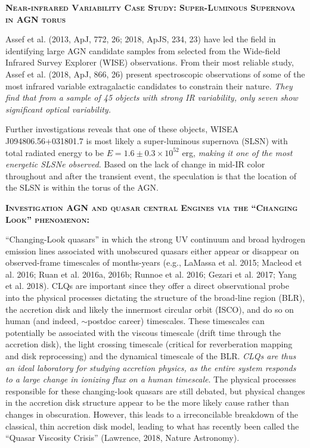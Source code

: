\documentclass[12pt]{article}
\begin{document}
\smallskip
\smallskip
\noindent
\textbf{\textsc{Near-infrared Variability Case Study: Super-Luminous Supernova in AGN torus}} 

\smallskip
\smallskip
\noindent
Assef et al. (2013, ApJ, 772, 26; 2018, ApJS, 234, 23) have led the field in identifying large AGN candidate samples from selected from the Wide-field Infrared Survey Explorer (WISE) observations. 
From their most reliable study, Assef et al. (2018, ApJ, 866, 26) present spectroscopic observations of some of the most infrared variable extragalactic candidates to constrain their nature. {\it They find that from a sample of 45 objects with strong IR variability, only seven show significant optical variability.}  

\smallskip
\smallskip
\noindent
Further investigations reveals that one of these objects, WISEA J094806.56+031801.7  is most likely a super-luminous supernova (SLSN) with total radiated energy to be $E=1.6\pm0.3 \times 10^{52}$ erg, {\it making it one of the most energetic SLSNe observed.} Based on the lack of change in mid-IR color throughout and after the transient event, the speculation is that the location of the SLSN is within the torus of the AGN. 


\smallskip
\smallskip
\noindent
\textbf{\textsc{Investigation AGN and quasar central Engines via the ``Changing Look'' phenomenon:}}

\smallskip
\smallskip
\noindent
``Changing-Look quasars'' 
 in which the strong UV continuum and broad hydrogen emission lines associated with unobscured quasars either appear or disappear on observed-frame timescales of months-years (e.g., LaMassa et al. 2015; Macleod et al. 2016; Ruan et al. 2016a, 2016b; Runnoe et al. 2016; Gezari et al. 2017; Yang et al. 2018). 
CLQs are important since they offer a direct observational probe into the physical processes dictating the structure of the broad-line region (BLR), the accretion disk and likely the innermost circular orbit (ISCO), 
and do so on human (and indeed, $\sim$postdoc career) timescales. 
These timescales can potentially be associated with the viscous timescale (drift time through the accretion disk), the light crossing timescale (critical for reverberation mapping and disk reprocessing) and the dynamical timescale of the BLR.  {\it CLQs are thus an ideal laboratory for studying accretion physics, as the entire system responds to a large change in ionizing flux on a human timescale}. 
The physical processes responsible for these changing-look quasars are still debated, but physical changes in the accretion disk structure appear to be the more likely cause rather than changes in obscuration. However, this leads to a irreconcilable breakdown of the classical, thin accretion disk model, leading to what has recently been called the ``Quasar Viscosity Crisis'' (Lawrence, 2018, Nature Astronomy). 
\end{document}
